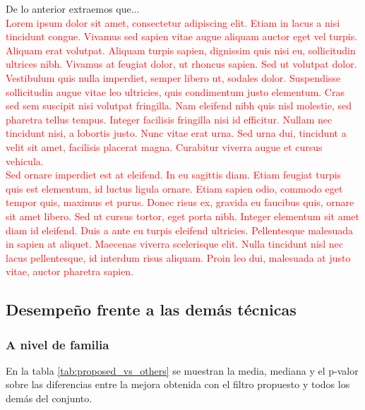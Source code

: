 \documentclass[print, color]{ugrTFG}
\begin{document}
 De lo anterior extraemos que...\\


\textcolor{red}{
 Lorem ipsum dolor sit amet, consectetur adipiscing elit. Etiam in lacus a nisi tincidunt congue. Vivamus sed sapien vitae augue aliquam auctor eget vel turpis. Aliquam erat volutpat. Aliquam turpis sapien, dignissim quis nisi eu, sollicitudin ultrices nibh. Vivamus at feugiat dolor, ut rhoncus sapien. Sed ut volutpat dolor. Vestibulum quis nulla imperdiet, semper libero ut, sodales dolor. Suspendisse sollicitudin augue vitae leo ultricies, quis condimentum justo elementum. Cras sed sem suscipit nisi volutpat fringilla. Nam eleifend nibh quis nisl molestie, sed pharetra tellus tempus. Integer facilisis fringilla nisi id efficitur. Nullam nec tincidunt nisi, a lobortis justo. Nunc vitae erat urna. Sed urna dui, tincidunt a velit sit amet, facilisis placerat magna. Curabitur viverra augue et cursus vehicula.\\ 
Sed ornare imperdiet est at eleifend. In eu sagittis diam. Etiam feugiat turpis quis est elementum, id luctus ligula ornare. Etiam sapien odio, commodo eget tempor quis, maximus et purus. Donec risus ex, gravida eu faucibus quis, ornare sit amet libero. Sed ut cursus tortor, eget porta nibh. Integer elementum sit amet diam id eleifend. Duis a ante eu turpis eleifend ultricies. Pellentesque malesuada in sapien at aliquet. Maecenas viverra scelerisque elit. Nulla tincidunt nisl nec lacus pellentesque, id interdum risus aliquam. Proin leo dui, malesuada at justo vitae, auctor pharetra sapien.
}\\ \newline

    
 \subsection{Desempeño frente a las demás técnicas}
 \subsubsection{A nivel de familia}
 En la tabla \ref{tab:proposed_vs_others} se muestran la media, mediana y el p-valor sobre las diferencias entre la mejora obtenida con el filtro propuesto y todos los demás del conjunto.
\end{document}
